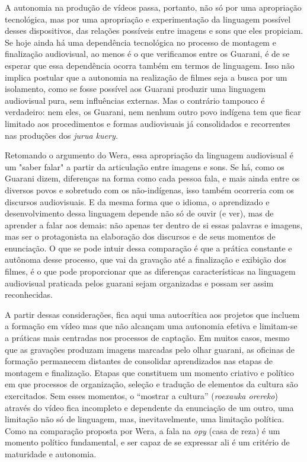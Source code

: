A autonomia na produção de vídeos passa, portanto, não só por uma
apropriação tecnológica, mas por uma apropriação e experimentação da
linguagem possível desses dispositivos, das relações possíveis entre
imagens e sons que eles propiciam. Se hoje ainda há uma dependência
tecnológica no processo de montagem e finalização audiovisual, ao menos
é o que verificamos entre os Guarani, é de se esperar que essa
dependência ocorra também em termos de linguagem. Isso não implica
postular que a autonomia na realização de filmes seja a busca por um
isolamento, como se fosse possível aos Guarani produzir uma linguagem
audiovisual pura, sem influências externas. Mas o contrário tampouco é
verdadeiro: nem eles, os Guarani, nem nenhum outro povo indígena tem que
ficar limitado aos procedimentos e formas audiovisuais já consolidados e
recorrentes nas produções dos \emph{jurua kuery.}

Retomando o argumento do Wera, essa apropriação da linguagem audiovisual
é um "saber falar" a partir da articulação entre imagens e sons. Se há,
como os Guarani dizem, diferenças na forma como cada pessoa fala, e mais
ainda entre os diversos povos e sobretudo com os não-indígenas, isso
também ocorreria com os discursos audiovisuais. E da mesma forma que o
idioma, o aprendizado e desenvolvimento dessa linguagem depende não só
de ouvir (e ver), mas de aprender a falar aos demais: não apenas ter
dentro de si essas palavras e imagens, mas ser o protagonista na
elaboração dos discursos e de seus momentos de enunciação. O que se pode
intuir dessa comparação é que a prática constante e autônoma desse
processo, que vai da gravação até a finalização e exibição dos filmes, é
o que pode proporcionar que as diferenças características na linguagem
audiovisual praticada pelos guarani sejam organizadas e possam ser assim
reconhecidas.

A partir dessas considerações, fica aqui uma autocrítica aos projetos
que incluem a formação em vídeo mas que não alcançam uma autonomia
efetiva e limitam-se a práticas mais centradas nos processos de
captação. Em muitos casos, mesmo que as gravações produzam imagens
marcadas pelo olhar guarani, as oficinas de formação permanecem
distantes de consolidar aprendizados nas etapas de montagem e
finalização. Etapas que constituem um momento criativo e político em que
processos de organização, seleção e tradução de elementos da cultura são
exercitados. Sem esses momentos, o ``mostrar a cultura'' (\emph{roexauka
orereko}) através do vídeo fica incompleto e dependente da enunciação de
um outro, uma limitação não só de linguagem, mas, inevitavelmente, uma
limitação política. Como na comparação proposta por Wera, a fala na
\emph{opy} (casa de reza) é um momento político fundamental, e ser capaz
de se expressar ali é um critério de maturidade e autonomia.

